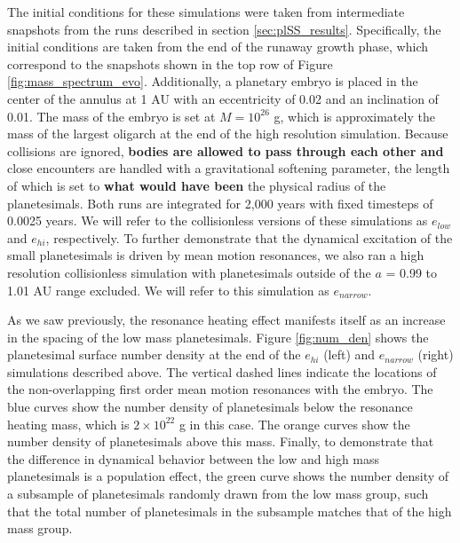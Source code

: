
The initial conditions for these simulations were taken from intermediate snapshots from the runs described in section 
\ref{sec:plSS_results}. Specifically, the initial conditions are taken from the end of the runaway growth phase, which correspond to the 
snapshots shown in the top row of Figure \ref{fig:mass_spectrum_evo}. Additionally, a planetary embryo is placed in the center of 
the annulus at 1 AU with an eccentricity of 0.02 and an inclination of 0.01. The mass of the embryo is set at $M = 10^{26}$ g, 
which is approximately the mass of the largest oligarch at the end of the high resolution simulation. Because collisions are 
ignored, \textbf{bodies are allowed to pass through each other and} close encounters are handled with a gravitational softening parameter, the length of which is set to \textbf{what would have been} the physical radius 
of the planetesimals. Both runs are integrated for 2,000 years with fixed timesteps of 0.0025 years. We will refer to the 
collisionless versions of these simulations as $e_{low}$ and $e_{hi}$, respectively. To further demonstrate that the dynamical 
excitation of the small planetesimals is driven by mean motion resonances, we also ran a high resolution collisionless simulation 
with planetesimals outside of the $a$ = 0.99 to 1.01 AU range excluded. We will refer to this simulation as $e_{narrow}$.

As we saw previously, the resonance heating effect manifests itself as an increase in the spacing of the low mass planetesimals. 
Figure \ref{fig:num_den} shows the planetesimal surface number density at the end of the $e_{hi}$ (left) and $e_{narrow}$ (right) 
simulations described above. The vertical dashed lines indicate the locations of the non-overlapping first order mean motion 
resonances with the embryo. The blue curves show the number density of planetesimals below the resonance heating mass, 
which is $2 \times 10^{22}$ g in this case. The orange curves show the number density of planetesimals above this mass. 
Finally, to demonstrate that the difference in dynamical behavior between the low and high mass planetesimals is a population 
effect, the green curve shows the number density of a subsample of planetesimals randomly drawn from the low mass group, 
such that the total number of planetesimals in the subsample matches that of the high mass group.

